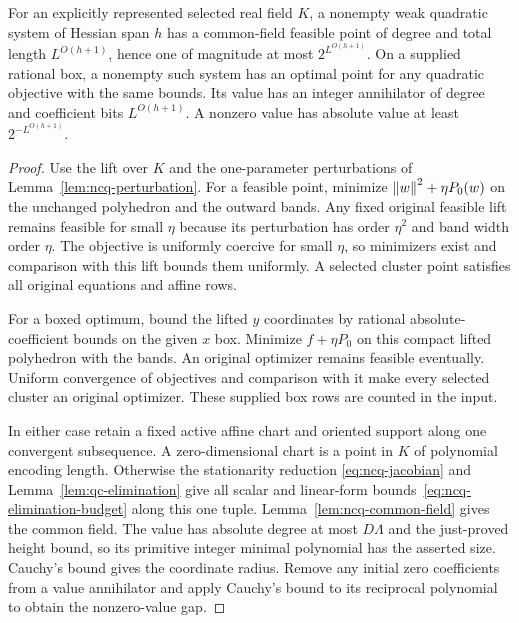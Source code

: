 \begin{lemma}
\label{lem:ncq-field-bounds}
For an explicitly represented selected real field $K$, a nonempty weak
quadratic system of Hessian span $h$ has a common-field feasible point of
degree and total length $L^{O(h+1)}$, hence one of magnitude at most
$2^{L^{O(h+1)}}$. On a supplied rational box, a nonempty such system has
an optimal point for any quadratic objective with the same bounds. Its
value has an integer annihilator of degree and coefficient bits
$L^{O(h+1)}$. A nonzero value has absolute value at least
$2^{-L^{O(h+1)}}$.
\end{lemma}

\begin{proof}
Use the lift over $K$ and the one-parameter perturbations of
Lemma~\ref{lem:ncq-perturbation}. For a feasible point, minimize
$\left\lVert w\right\rVert^2+\eta P_0(w)$ on the unchanged polyhedron and the outward
bands. Any fixed original feasible lift remains feasible for small $\eta$
because its perturbation has order $\eta^2$ and band width order $\eta$.
The objective is uniformly coercive for small $\eta$, so minimizers
exist and comparison with this lift bounds them uniformly. A selected
cluster point satisfies all original equations and affine rows.

For a boxed optimum, bound the lifted $y$ coordinates by rational
absolute-coefficient bounds on the given $x$ box. Minimize $f+\eta P_0$
on this compact lifted polyhedron with the bands. An original optimizer
remains feasible eventually. Uniform convergence of objectives and
comparison with it make every selected cluster an original optimizer.
These supplied box rows are counted in the input.

In either case retain a fixed active affine chart and oriented support
along one convergent subsequence. A zero-dimensional chart is a point in
$K$ of polynomial encoding length. Otherwise the stationarity reduction
\eqref{eq:ncq-jacobian} and Lemma~\ref{lem:qc-elimination} give all scalar
and linear-form bounds~\eqref{eq:ncq-elimination-budget} along this one
tuple. Lemma~\ref{lem:ncq-common-field} gives the common field. The value
has absolute degree at most $D\Lambda$ and the just-proved height bound,
so its primitive integer minimal polynomial has the asserted size.
Cauchy's bound gives the coordinate radius. Remove any initial zero
coefficients from a value annihilator and apply Cauchy's bound to its
reciprocal polynomial to obtain the nonzero-value gap.
\end{proof}

